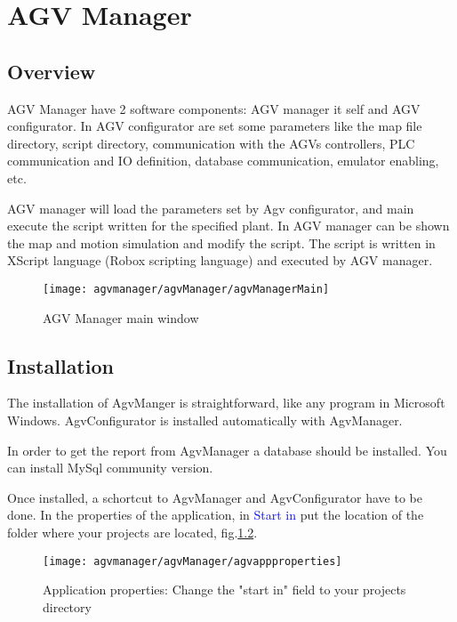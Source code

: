 

\chapter{AGV Manager}

\section{Overview}
AGV Manager have 2 software components: AGV manager it self and AGV configurator.
In AGV configurator are set some parameters like the map file directory, script directory, communication with the AGVs controllers, PLC communication and IO definition, database communication, emulator enabling, etc.

AGV manager will load the parameters set by Agv configurator, and main execute the script written for the specified plant. In AGV manager can be shown the map and motion simulation and modify the script. The script is written in XScript language (Robox scripting language) and executed by AGV manager.

\begin{figure}
	\centering\texttt{[image: agvmanager/agvManager/agvManagerMain]}
	\caption{AGV Manager main window}
	\label{fig:agvManagerMain}
\end{figure}

\section{Installation}
The installation of AgvManger is straightforward, like any program in Microsoft Windows. AgvConfigurator is installed automatically with AgvManager.

In order to get the report from AgvManager a database should be installed. You can install MySql community version.

Once installed, a schortcut to AgvManager and AgvConfigurator have to be done. In the properties of the application, in \textcolor{blue}{Start in} put the location of the folder where your projects are located, fig.\ref{fig:agvappproperties}.

\begin{figure}
	\centering\texttt{[image: agvmanager/agvManager/agvappproperties]}
	\caption{Application properties: Change the "start in" field to your projects directory}
	\label{fig:agvappproperties}
\end{figure}

